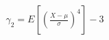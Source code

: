 \documentclass[preview]{standalone}
\begin{document}
\begin{align*}
\gamma_2 = E\left[ \left( \frac{X-\mu}{\sigma} \right)^4 \right] - 3
\end{align*}
\end{document}
